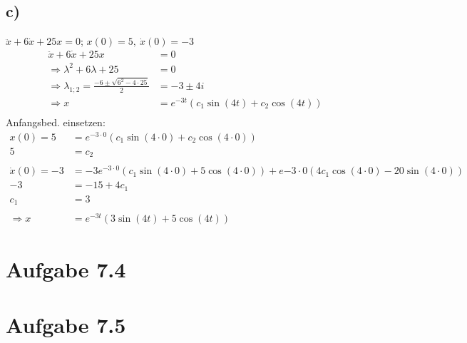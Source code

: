 \documentclass{theozettel}
\begin{document}
\subsection*{c)}$\ddot{x}+6\dot{x}+25x=0$; $x\left(0\right)=5, \ \dot{x}\left(0\right)=-3$
\begin{align*}
\ddot{x}+6\dot{x}+25x&=0\\
\Rightarrow \lambda^2+6\lambda +25&=0\\
\Rightarrow\lambda_{1;2}=\frac{-6\pm\sqrt{6^2-4\cdot 25}}{2}&=-3\pm 4i\\
\Rightarrow x&=e^{-3t}\left(c_1\sin\left(4t\right)+c_2\cos\left(4t\right)\right)\\
\end{align*}
Anfangsbed. einsetzen:
\begin{align*}
x\left(0\right)=5&=e^{-3\cdot 0}\left(c_1\sin\left(4\cdot 0\right)+c_2\cos\left(4\cdot 0\right)\right)\\
5&=c_2\\\\
\dot{x}\left(0\right)=-3&=-3e^{-3\cdot 0}\left(c_1\sin\left(4\cdot 0\right)+5\cos\left(4\cdot 0\right)\right)+e{-3\cdot 0}\left(4c_1\cos\left(4\cdot 0\right)-20\sin\left(4\cdot 0\right)\right)\\
-3&=-15+4c_1\\
c_1&=3\\\\
\Rightarrow x&=e^{-3t}\left(3\sin\left(4t\right)+5\cos\left(4t\right)\right)
\end{align*}
\section*{Aufgabe 7.4} 



\section*{Aufgabe 7.5} 
\end{document}
